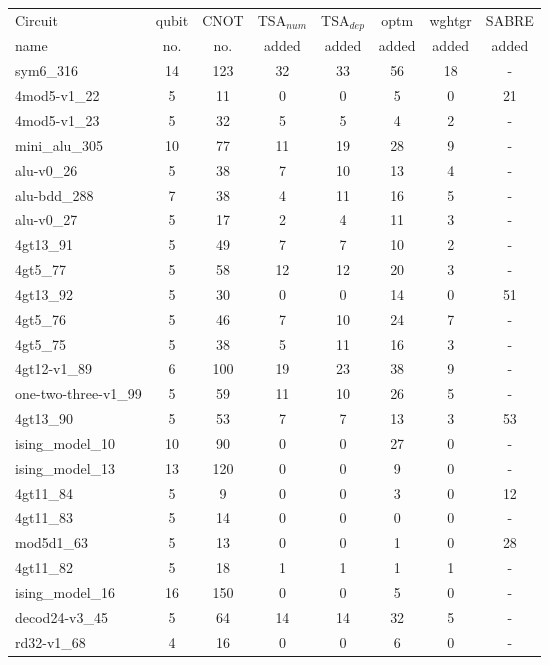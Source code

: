 \documentclass[journal]{IEEEtran}
\begin{document}
	\begin{table*}[htbp]
		\begin{center}  
			\begin{tabular}{|p{4.3cm}<{\centering}|c|c|c|c|c|c|c|}
				\hline
				Circuit &  qubit  & CNOT &TSA$_{num}$& TSA$_{dep}$  & optm 	 & wghtgr  &SABRE 	\\
				name	&   no. 	&	no. & added&  added &  added 	&  added &  added\\
				\hline
				sym6\_316 & 14 & 123 & 32 & 33 & 56 & 18 & - \\ 
				4mod5-v1\_22 & 5 & 11 & 0 & 0 & 5 & 0 & 21 \\ 
				4mod5-v1\_23 & 5 & 32 & 5 & 5 & 4 & 2 & - \\ 
				mini\_alu\_305 & 10 & 77 & 11 & 19 & 28 & 9 & - \\ 
				alu-v0\_26 & 5 & 38 & 7 & 10 & 13 & 4 & - \\ 
				alu-bdd\_288 & 7 & 38 & 4 & 11 & 16 & 5 & - \\ 
				alu-v0\_27 & 5 & 17 & 2 & 4 & 11 & 3 & - \\ 
				4gt13\_91 & 5 & 49 & 7 & 7 & 10 & 2 & - \\ 
				4gt5\_77 & 5 & 58 & 12 & 12 & 20 & 3 & - \\ 
				4gt13\_92 & 5 & 30 & 0 & 0 & 14 & 0 & 51 \\ 
				4gt5\_76 & 5 & 46 & 7 & 10 & 24 & 7 & - \\ 
				4gt5\_75 & 5 & 38 & 5 & 11 & 16 & 3 & - \\ 
				4gt12-v1\_89 & 6 & 100 & 19 & 23 & 38 & 9 & - \\ 
				one-two-three-v1\_99 & 5 & 59 & 11 & 10 & 26 & 5 & - \\ 
				4gt13\_90 & 5 & 53 & 7 & 7 & 13 & 3 & 53 \\ 
				ising\_model\_10 & 10 & 90 & 0 & 0 & 27 & 0 & - \\ 
				ising\_model\_13 & 13 & 120 & 0 & 0 & 9 & 0 & - \\ 
				4gt11\_84 & 5 & 9 & 0 & 0 & 3 & 0 & 12 \\ 
				4gt11\_83 & 5 & 14 & 0 & 0 & 0 & 0 & - \\ 
				mod5d1\_63 & 5 & 13 & 0 & 0 & 1 & 0 & 28 \\ 
				4gt11\_82 & 5 & 18 & 1 & 1 & 1 & 1 & - \\ 
				ising\_model\_16 & 16 & 150 & 0 & 0 & 5 & 0 & - \\ 
				decod24-v3\_45 & 5 & 64 & 14 & 14 & 32 & 5 & - \\ 
				rd32-v1\_68 & 4 & 16 & 0 & 0 & 6 & 0 & - \\ 

\end{tabular}
\end{center}
\end{table*}
\end{document}

